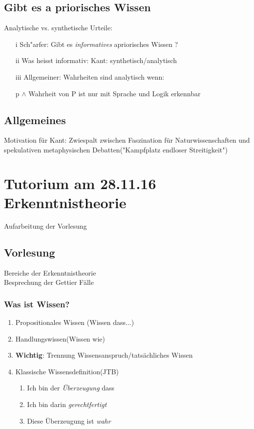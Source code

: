 \documentclass[emulatestandardclasses]{scrartcl}
\begin{document}
\subsection{Gibt es a priorisches Wissen}
Analytische vs. synthetische Urteile:
\begin{itemize}
	\item[i] Sch"arfer: Gibt es \textit{informatives} apriorisches Wissen ?
	\item[ii] Was heisst informativ: Kant: synthetisch/analytisch
	\item[iii] Allgemeiner: Wahrheiten sind analytisch wenn:\par p $\wedge$ Wahrheit von P ist nur mit Sprache und Logik erkennbar\\
\end{itemize}
\subsection{Allgemeines}
Motivation für Kant: Zwiespalt zwischen Faszination für Naturwissenschaften und spekulativen metaphysischen Debatten("Kampfplatz endloser Streitigkeit")
\section{Tutorium am 28.11.16\\Erkenntnistheorie}
Aufarbeitung der Vorlesung
\subsection{Vorlesung}
Bereiche der Erkenntnistheorie\\
Besprechung der Gettier Fälle

	\subsubsection {Was ist Wissen?} \begin{enumerate}
	\item Propositionales Wissen (Wissen dass...)
	\item Handlungswissen(Wissen wie)
	
	\item \textbf{Wichtig}: Trennung Wissensanspruch/tatsächliches Wissen
	\item Klassische Wissensdefinition(JTB)
	 \begin{enumerate}
	 	\item Ich bin der \emph{Überzeugung} dass
	 	\item Ich bin darin \emph{gerechtfertigt}
	 	\item Diese Überzeugung ist \emph{wahr}
	 \end{enumerate}
	 \end{enumerate}
	
\end{document}
